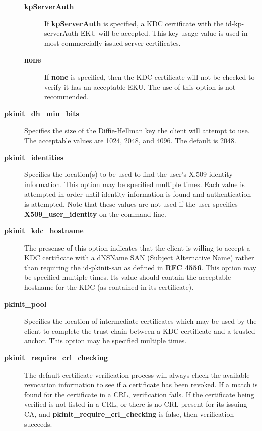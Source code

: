 \documentclass[letterpaper,10pt,english]{sphinxmanual}
\begin{document}
\begin{description}
\begin{description}
\item[{\textbf{kpServerAuth}}] \leavevmode
If \textbf{kpServerAuth} is specified, a KDC certificate with the
id-kp-serverAuth EKU will be accepted.  This key usage value
is used in most commercially issued server certificates.

\item[{\textbf{none}}] \leavevmode
If \textbf{none} is specified, then the KDC certificate will not be
checked to verify it has an acceptable EKU.  The use of this
option is not recommended.

\end{description}

\item[{\textbf{pkinit\_dh\_min\_bits}}] \leavevmode
Specifies the size of the Diffie-Hellman key the client will
attempt to use.  The acceptable values are 1024, 2048, and 4096.
The default is 2048.

\item[{\textbf{pkinit\_identities}}] \leavevmode
Specifies the location(s) to be used to find the user's X.509
identity information.  This option may be specified multiple
times.  Each value is attempted in order until identity
information is found and authentication is attempted.  Note that
these values are not used if the user specifies
\textbf{X509\_user\_identity} on the command line.

\item[{\textbf{pkinit\_kdc\_hostname}}] \leavevmode
The presense of this option indicates that the client is willing
to accept a KDC certificate with a dNSName SAN (Subject
Alternative Name) rather than requiring the id-pkinit-san as
defined in \href{http://tools.ietf.org/html/rfc4556.html}{\textbf{RFC 4556}}.  This option may be specified multiple
times.  Its value should contain the acceptable hostname for the
KDC (as contained in its certificate).

\item[{\textbf{pkinit\_pool}}] \leavevmode
Specifies the location of intermediate certificates which may be
used by the client to complete the trust chain between a KDC
certificate and a trusted anchor.  This option may be specified
multiple times.

\item[{\textbf{pkinit\_require\_crl\_checking}}] \leavevmode
The default certificate verification process will always check the
available revocation information to see if a certificate has been
revoked.  If a match is found for the certificate in a CRL,
verification fails.  If the certificate being verified is not
listed in a CRL, or there is no CRL present for its issuing CA,
and \textbf{pkinit\_require\_crl\_checking} is false, then verification
succeeds.


\end{description}
\end{document}
